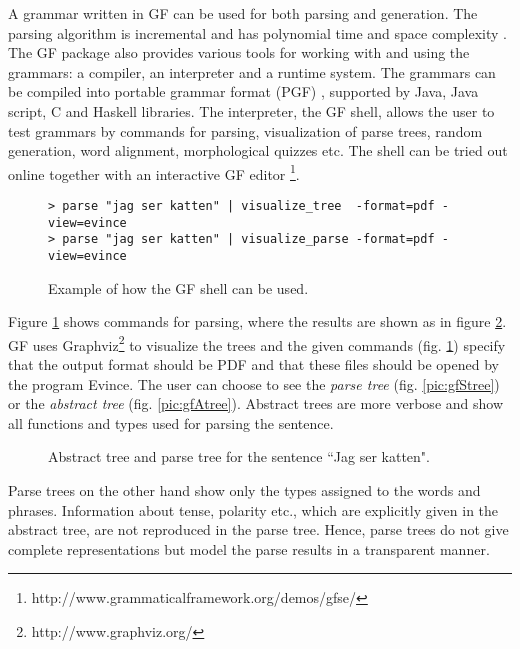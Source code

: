 \documentclass[runningheads,a4paper]{llncs}
\begin{document}
A grammar written in GF can be used for both parsing and generation.
The parsing algorithm is incremental and has polynomial time and space
complexity \cite{gfMech}. 
The GF package also provides various tools for working with and using the grammars:
a compiler, an interpreter and a runtime system.
The grammars can be compiled into portable grammar format (PGF) \cite{pgf},
supported by Java, Java script, C and Haskell libraries. 
The interpreter, the GF shell, allows
the user to test grammars by commands for parsing, visualization of parse trees,
random generation, word alignment, morphological quizzes etc.
The shell can be tried out online 
together with an interactive GF editor 
\footnote{http://www.grammaticalframework.org/demos/gfse/}.
\thispagestyle{plain}
\begin{figure}[h]
\begin{verbatim} 
> parse "jag ser katten" | visualize_tree  -format=pdf -view=evince
> parse "jag ser katten" | visualize_parse -format=pdf -view=evince
\end{verbatim}
\caption{Example of how the GF shell can be used.}\label{fig:shellvp}
\label{fig:shell}
\end{figure}
Figure \ref{fig:shell} shows commands for parsing, where the results are shown as
in figure \ref{fig:gftree1}. 
GF uses Graphviz\footnote{http://www.graphviz.org/}
to visualize the trees and the given commands (fig. \ref{fig:shell}) specify that the
output format should be PDF and that these files should be opened by the program
Evince. The user can choose to see the \textit{parse tree} (fig. \ref{pic:gfStree})
or the \textit{abstract tree} (fig. \ref{pic:gfAtree}). Abstract trees are more verbose and show all
functions and types used for parsing the sentence. 
\begin{figure}[!h]
\centering
{}
\label{fig:gftree1}
\caption{Abstract tree and parse tree for the sentence ``Jag ser katten".}
\label{fig:gftree1}
\end{figure}
Parse trees on the other hand show only the types assigned to the words and phrases.
Information about tense, polarity etc., which are explicitly given in the abstract tree, are
not reproduced in the parse tree. Hence, parse trees do not give complete representations
but model the parse results in a transparent manner.
\end{document}
